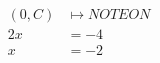 \documentclass[preview]{standalone}
\begin{document}
\begin{align*}
(0,C) & \mapsto NOTEON \\ 2x & = -4 \\ x & = -2
\end{align*}
\end{document}
